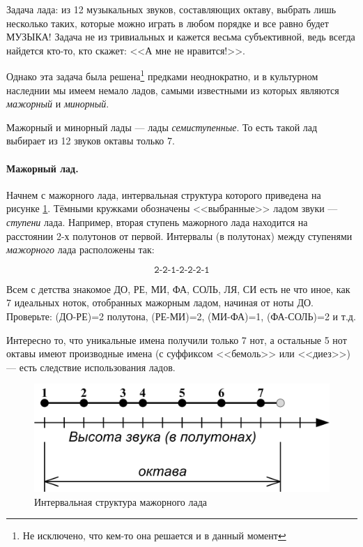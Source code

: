 Задача лада: из 12 музыкальных звуков, составляющих октаву, выбрать лишь несколько таких, которые можно играть в любом порядке и все равно будет МУЗЫКА! Задача не из тривиальных и кажется весьма субъективной, ведь всегда найдется кто-то, кто скажет: <<А мне не нравится!>>. 

Однако эта задача была решена\footnote{Не исключено, что кем-то она решается и в данный момент} предками неоднократно, и в культурном наследнии мы имеем немало ладов, самыми известными из которых являются \emph{мажорный} и \emph{минорный}.

Мажорный и минорный лады --- лады \emph{семиступенные}. То есть такой лад выбирает из 12 звуков октавы только 7.

\paragraph{Мажорный лад.} Начнем с мажорного лада, интервальная структура которого приведена на рисунке \ref{fig:harmony:lad:mode:maj}. Тёмными кружками обозначены <<выбранные>> ладом звуки --- \emph{ступени} лада. Например, вторая ступень мажорного лада находится на расстоянии 2-х полутонов от первой. Интервалы (в полутонах) между ступенями \emph{мажорного} лада расположены так:

\[
    \texttt{2-2-1-2-2-2-1}
\]

Всем с детства знакомое ДО, РЕ, МИ, ФА, СОЛЬ, ЛЯ, СИ есть не что иное, как 7 идеальных ноток, отобранных мажорным ладом, начиная от ноты ДО. Проверьте: (ДО-РЕ)=2 полутона, (РЕ-МИ)=2, (МИ-ФА)=1, (ФА-СОЛЬ)=2 и т.д. 

Интересно то, что уникальные имена получили только 7 нот, а остальные 5 нот октавы имеют производные имена (с суффиксом <<бемоль>> или <<диез>>) --- есть следствие использования ладов.

\begin{figure}[!ht]
    \centering
    \includegraphics{fig/intervals/mode-maj} 
    \caption{Интервальная структура мажорного лада}\label{fig:harmony:lad:mode:maj}
\end{figure} 

